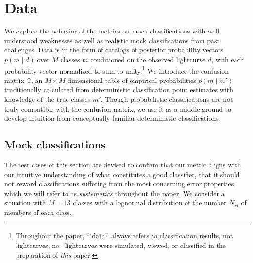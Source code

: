 \section{Data}
\label{sec:data}

We explore the behavior of the metrics on mock classifications with well-understood weaknesses as well as realistic mock classifications from past challenges.
Data is in the form of catalogs of posterior probability vectors $p(m \mid d)$ over $M$ classes $m$ conditioned on the observed lightcurve $d$, with each probability vector normalized to sum to unity.\footnote{Throughout the paper, ```data'' always refers to classification results, not lightcurves; no \plasticc\ lightcurves were simulated, viewed, or classified in the preparation of \textit{this} paper.}
We introduce the confusion matrix $\mathbb{C}$, an $M\times M$ dimensional table of empirical probabilities $p(m \mid m')$ traditionally calculated from deterministic classification point estimates with knowledge of the true classes $m'$.
Though probabilistic classifications are not truly compatible with the confusion matrix, we use it as a middle ground to develop intuition from conceptually familiar deterministic classifications.

\subsection{Mock classifications}
\label{sec:mockdata}

The test cases of this section are devised to confirm that our metric aligns with our intuitive understanding of what constitutes a good classifier, that it should not reward classifications suffering from the most concerning error properties, which we will refer to as \textit{systematics} throughout the paper.
We consider a situation with $M=13$ classes
with a lognormal distribution of the number $N_{m}$ of members of each class.

